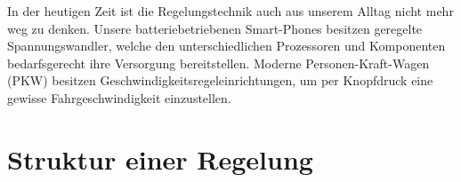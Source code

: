 %
In der heutigen Zeit ist die Regelungstechnik auch aus unserem Alltag nicht mehr weg zu denken. Unsere batteriebetriebenen Smart-Phones besitzen geregelte Spannungswandler, welche den unterschiedlichen Prozessoren und Komponenten bedarfsgerecht ihre Versorgung bereitstellen. Moderne Personen-Kraft-Wagen (PKW) besitzen Geschwindigkeitsregeleinrichtungen, um per Knopfdruck eine gewisse Fahrgeschwindigkeit einzustellen. 
%
%
\newpage
%
\section{Struktur einer Regelung}
%
